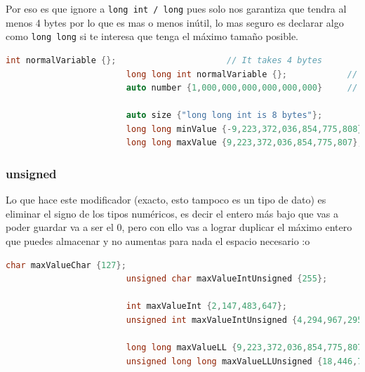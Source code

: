 \documentclass[12pt, fleqn]{report}                             %
\theoremstyle{break}                                            %
\newcommand{\textCode}[1]  { \texttt{#1} }                      %
\begin{document}
                    Por eso es que ignore a \textCode{long int / long} pues solo nos garantiza que tendra al menos 4 bytes
                    por lo que es mas o menos inútil, lo mas seguro es declarar algo como \textCode{long long}
                    si te interesa que tenga el máximo tamaño posible.
                    \begin{lstlisting}[language=C++, gobble=24]
                        int normalVariable {};                      // It takes 4 bytes     
                        long long int normalVariable {};            // It takes 8 bytes 
                        auto number {1,000,000,000,000,000,000}     // number is long long  

                        auto size {"long long int is 8 bytes"};
                        long long minValue {-9,223,372,036,854,775,808};
                        long long maxValue {9,223,372,036,854,775,807};
                    \end{lstlisting}


                \subsubsection{unsigned}

                    Lo que hace este modificador (exacto, esto tampoco es un tipo de dato)
                    es eliminar el signo de los tipos numéricos, es decir el entero más bajo que vas
                    a poder guardar va a ser el 0, pero con ello vas a lograr duplicar
                    el máximo entero que puedes almacenar y no aumentas para nada el espacio necesario :o
                    \begin{lstlisting}[language=C++, gobble=24]
                        char maxValueChar {127};                    
                        unsigned char maxValueIntUnsigned {255};
                        
                        int maxValueInt {2,147,483,647};                    
                        unsigned int maxValueIntUnsigned {4,294,967,295};
                        
                        long long maxValueLL {9,223,372,036,854,775,807};                    
                        unsigned long long maxValueLLUnsigned {18,446,744,073,709,551,615};
                    \end{lstlisting}
\end{document}
